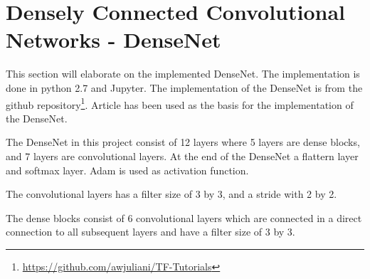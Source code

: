 \section{Densely Connected Convolutional Networks - DenseNet}

This section will elaborate on the implemented DenseNet. The implementation is done in python 2.7 and Jupyter. The implementation of the DenseNet is from the github repository\footnote{\url{https://github.com/awjuliani/TF-Tutorials}}. Article \citep{DENSE} has been used as the basis for the implementation of the DenseNet.

The DenseNet in this project consist of 12 layers where 5 layers are dense blocks, and 7 layers are convolutional layers. At the end of the DenseNet a flattern layer and softmax layer. Adam is used as activation function.

The convolutional layers has a filter size of 3 by 3, and a stride with 2 by 2. 

The dense blocks consist of 6 convolutional layers which are connected in a direct connection to all subsequent layers and have a filter size of 3 by 3.